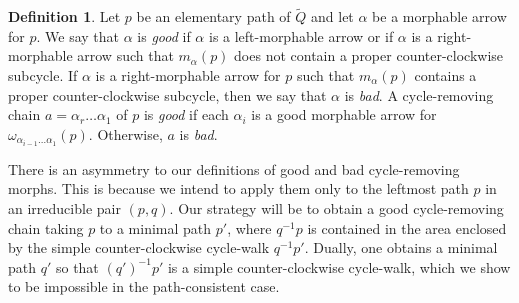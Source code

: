 \documentclass{article}
\theoremstyle{definition}
\newtheorem{defn}[thm]{Definition}
\begin{document}
\begin{defn}
	Let $p$ be an elementary path of $\widetilde Q$ and let $\alpha$ be a morphable arrow for $p$. We say that $\alpha$ is \textit{good} if $\alpha$ is a left-morphable arrow or if $\alpha$ is a right-morphable arrow such that $m_\alpha(p)$ does not contain a proper counter-clockwise subcycle. If $\alpha$ is a right-morphable arrow for $p$ such that $m_\alpha(p)$ contains a proper counter-clockwise subcycle, then we say that $\alpha$ is \textit{bad}.
	A cycle-removing chain $a=\alpha_r\dots\alpha_1$ of $p$ is \textit{good} if each $\alpha_i$ is a good morphable arrow for $\omega_{\alpha_{i-1}\dots\alpha_{1}}(p)$. Otherwise, $a$ is \textit{bad}. 
\end{defn}

There is an asymmetry to our definitions of good and bad cycle-removing morphs. This is because we intend to apply them only to the leftmost path $p$ in an irreducible pair $(p,q)$. Our strategy will be to obtain a good cycle-removing chain taking $p$ to a minimal path $p'$, where $q^{-1}p$ is contained in the area enclosed by the simple counter-clockwise cycle-walk $q^{-1}p'$. Dually, one obtains a minimal path $q'$ so that $(q')^{-1}p'$ is a simple counter-clockwise cycle-walk, which we show to be impossible in the path-consistent case.
\end{document}
